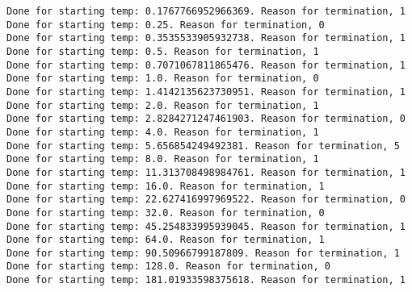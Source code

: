 \documentclass[11pt]{article}
\begin{document}
    \begin{Verbatim}[commandchars=\\\{\}]
Done for starting temp: 0.1767766952966369. Reason for termination, 1
Done for starting temp: 0.25. Reason for termination, 0
Done for starting temp: 0.3535533905932738. Reason for termination, 1
Done for starting temp: 0.5. Reason for termination, 1
Done for starting temp: 0.7071067811865476. Reason for termination, 1
Done for starting temp: 1.0. Reason for termination, 0
Done for starting temp: 1.4142135623730951. Reason for termination, 1
Done for starting temp: 2.0. Reason for termination, 1
Done for starting temp: 2.8284271247461903. Reason for termination, 0
Done for starting temp: 4.0. Reason for termination, 1
Done for starting temp: 5.656854249492381. Reason for termination, 5
Done for starting temp: 8.0. Reason for termination, 1
Done for starting temp: 11.313708498984761. Reason for termination, 1
Done for starting temp: 16.0. Reason for termination, 1
Done for starting temp: 22.627416997969522. Reason for termination, 0
Done for starting temp: 32.0. Reason for termination, 0
Done for starting temp: 45.254833995939045. Reason for termination, 1
Done for starting temp: 64.0. Reason for termination, 1
Done for starting temp: 90.50966799187809. Reason for termination, 1
Done for starting temp: 128.0. Reason for termination, 0
Done for starting temp: 181.01933598375618. Reason for termination, 1

    \end{Verbatim}
\end{document}
